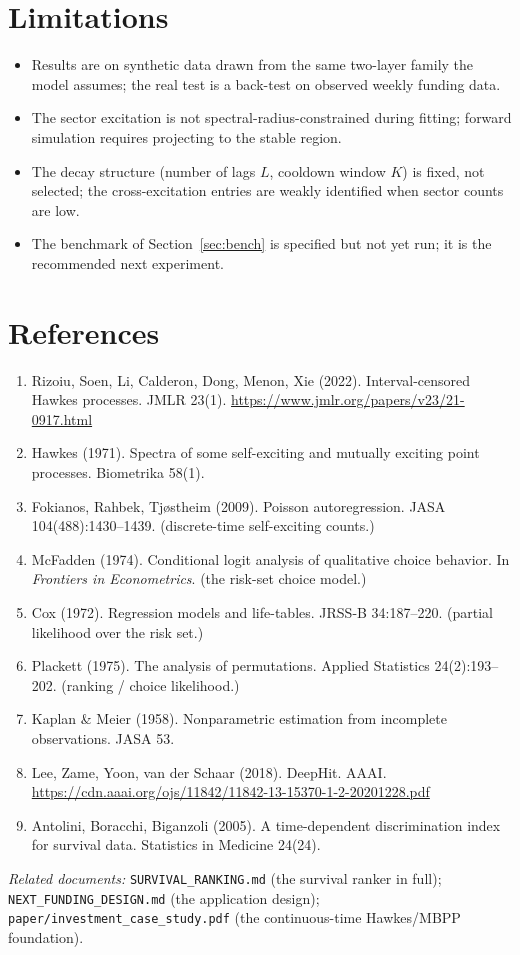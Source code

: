 \documentclass[11pt]{article}
\newcommand{\code}[1]{\texttt{#1}}
\begin{document}
\section{Limitations}

\begin{itemize}[leftmargin=1.3em,itemsep=2pt]
\item Results are on synthetic data drawn from the same two-layer family the model
assumes; the real test is a back-test on observed weekly funding data.
\item The sector excitation is not spectral-radius-constrained during fitting; forward
simulation requires projecting to the stable region.
\item The decay structure (number of lags $L$, cooldown window $K$) is fixed, not
selected; the cross-excitation entries are weakly identified when sector counts are low.
\item The benchmark of Section~\ref{sec:bench} is specified but not yet run; it is the
recommended next experiment.
\end{itemize}

\section{References}

\begin{enumerate}[leftmargin=1.6em,itemsep=2pt]
\item Rizoiu, Soen, Li, Calderon, Dong, Menon, Xie (2022). Interval-censored Hawkes
processes. JMLR 23(1). \url{https://www.jmlr.org/papers/v23/21-0917.html}
\item Hawkes (1971). Spectra of some self-exciting and mutually exciting point processes.
Biometrika 58(1).
\item Fokianos, Rahbek, Tj\o stheim (2009). Poisson autoregression. JASA 104(488):1430--1439.
(discrete-time self-exciting counts.)
\item McFadden (1974). Conditional logit analysis of qualitative choice behavior. In
\emph{Frontiers in Econometrics}. (the risk-set choice model.)
\item Cox (1972). Regression models and life-tables. JRSS-B 34:187--220. (partial
likelihood over the risk set.)
\item Plackett (1975). The analysis of permutations. Applied Statistics 24(2):193--202.
(ranking / choice likelihood.)
\item Kaplan \& Meier (1958). Nonparametric estimation from incomplete observations. JASA 53.
\item Lee, Zame, Yoon, van der Schaar (2018). DeepHit. AAAI.
\url{https://cdn.aaai.org/ojs/11842/11842-13-15370-1-2-20201228.pdf}
\item Antolini, Boracchi, Biganzoli (2005). A time-dependent discrimination index for
survival data. Statistics in Medicine 24(24).
\end{enumerate}

\noindent\emph{Related documents:} \code{SURVIVAL\_RANKING.md} (the survival ranker in
full); \code{NEXT\_FUNDING\_DESIGN.md} (the application design);
\code{paper/investment\_case\_study.pdf} (the continuous-time Hawkes/MBPP foundation).
\end{document}
